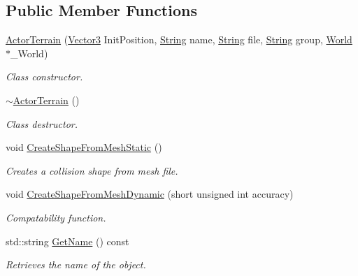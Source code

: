 \subsection*{Public Member Functions}
\begin{DoxyCompactItemize}
\item 
\hyperlink{classphys_1_1ActorTerrain_a9f4f3381dcca132d7c699176fe4dfc5c}{ActorTerrain} (\hyperlink{classphys_1_1Vector3}{Vector3} InitPosition, \hyperlink{namespacephys_aa03900411993de7fbfec4789bc1d392e}{String} name, \hyperlink{namespacephys_aa03900411993de7fbfec4789bc1d392e}{String} file, \hyperlink{namespacephys_aa03900411993de7fbfec4789bc1d392e}{String} group, \hyperlink{classphys_1_1World}{World} $\ast$\_\-World)
\begin{DoxyCompactList}\small\item\em Class constructor. \item\end{DoxyCompactList}\item 
\hyperlink{classphys_1_1ActorTerrain_af6ef2e3694b7afe0b59cfa0909c0490c}{$\sim$ActorTerrain} ()
\begin{DoxyCompactList}\small\item\em Class destructor. \item\end{DoxyCompactList}\item 
void \hyperlink{classphys_1_1ActorTerrain_a2403c40af6799e67c9aff1520b02dc0b}{CreateShapeFromMeshStatic} ()
\begin{DoxyCompactList}\small\item\em Creates a collision shape from mesh file. \item\end{DoxyCompactList}\item 
void \hyperlink{classphys_1_1ActorTerrain_aa5f545a73da45ab219121c4b2cd0ded9}{CreateShapeFromMeshDynamic} (short unsigned int accuracy)
\begin{DoxyCompactList}\small\item\em Compatability function. \item\end{DoxyCompactList}\item 
std::string \hyperlink{classphys_1_1ActorTerrain_a08f306ae189e55d780dcaa2c43d7b6eb}{GetName} () const 
\begin{DoxyCompactList}\small\item\em Retrieves the name of the object. \item\end{DoxyCompactList}\item 

\end{DoxyCompactItemize}
